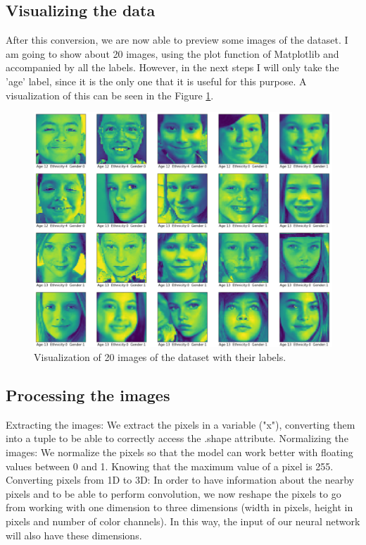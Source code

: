 \documentclass{article}
\begin{document}
\subsection{Visualizing the data}

After this conversion, we are now able to preview some images of the dataset. I am going to show about 20 images, using the plot function of Matplotlib and accompanied by all the labels. However, in the next steps I will only take the 'age' label, since it is the only one that it is useful for this purpose. A visualization of this can be seen in the Figure \ref{fig:visualization}.

\begin{figure}[t]
\centering
\includegraphics[width=1\columnwidth]{visualization_images.png}
\caption{Visualization of 20 images of the dataset with their labels.\label{fig:visualization}}
\end{figure}

\subsection{Processing the images}
Extracting the images:
We extract the pixels in a variable ("x"), converting them into a tuple to be able to correctly access the .shape attribute.
Normalizing the images:
We normalize the pixels so that the model can work better with floating values between 0 and 1. Knowing that the maximum value of a pixel is 255.
Converting pixels from 1D to 3D:
In order to have information about the nearby pixels and to be able to perform convolution, we now reshape the pixels to go from working with one dimension to three dimensions (width in pixels, height in pixels and number of color channels). In this way, the input of our neural network will also have these dimensions.
\end{document}
